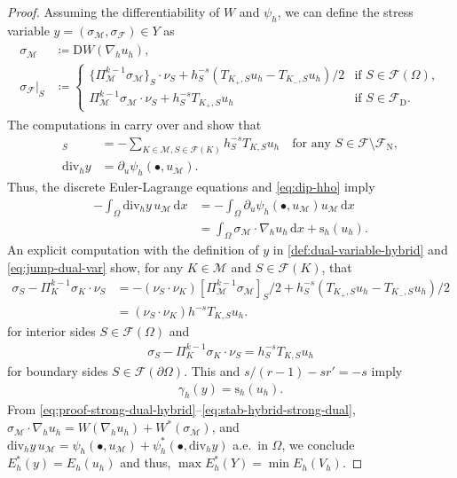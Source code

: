 \documentclass[a4paper]{amsart}
\numberwithin{equation}{section}
\renewcommand{\d}[1]{\,\mathrm{d}#1}
\renewcommand{\div}{\mathrm{div}}
\newcommand{\Mcal}{\mathcal{M}}
\newcommand{\D}{\mathrm{D}}
\newcommand{\s}{\mathrm{s}}
\theoremstyle{remark}
\begin{document}
\begin{proof}
	Assuming the differentiability of $W$ and $\psi_h$, we can define the stress variable $y = (\sigma_\Mcal, \sigma_\mathcal{F}) \in Y$ as
	\begin{align}\label{def:dual-variable-hybrid}
		\begin{split}
			\sigma_\Mcal &\coloneqq \D W(\nabla_h u_h),\\
			\sigma_\mathcal{F}|_S &\coloneqq \begin{cases}
				\{\Pi_\Mcal^{k-1} \sigma_\Mcal\}_S \cdot \nu_S + h_S^{-s}(T_{K_+,S} u_h - T_{K_-,S} u_h)/2 &\mbox{if } S \in \mathcal{F}(\Omega),\\
				\Pi_\Mcal^{k-1} \sigma_\Mcal \cdot \nu_S + h_S^{-s}T_{K_+,S} u_h &\mbox{if } S \in \mathcal{F}_\mathrm{D}.
			\end{cases}
		\end{split} 
	\end{align}
The computations in \cite[Corollary 5.1 and Lemma 5.2]{Tran2024} carry over and show that
	\begin{align}
		[\sigma_\Mcal \nu_S]_S &= - \sum_{K \in \Mcal, S \in \mathcal{F}(K)} h_S^{-s} T_{K,S} u_h \quad\text{for any } S\in\mathcal{F}\setminus\mathcal{F}_\mathrm{N},\label{eq:jump-dual-var}\\
		\div_h y &= \partial_u \psi_h(\bullet,u_\Mcal).\nonumber
	\end{align}
	Thus, the discrete Euler-Lagrange equations and \eqref{eq:dip-hho} imply
	\begin{align}\label{eq:proof-strong-dual-hybrid}
		- \int_\Omega \div_h y\, u_\Mcal \d{x} & = - \int_\Omega \partial_u \psi_h(\bullet,u_\Mcal) u_\Mcal \d{x}\nonumber\\
		& = \int_\Omega \sigma_\Mcal \cdot \nabla_h u_h \d{x} + \s_h(u_h).
	\end{align}
	An explicit computation with the definition of $y$ in \eqref{def:dual-variable-hybrid} and \eqref{eq:jump-dual-var} show, for any $K \in \Mcal$ and $S \in \mathcal{F}(K)$, that
	\begin{align*}
		\sigma_S - \Pi_K^{k-1} \sigma_K \cdot \nu_S &= -(\nu_S \cdot \nu_K)[\Pi_\Mcal^{k-1} \sigma_\Mcal]_S/2 + h_S^{-s}(T_{K_+,S} u_h - T_{K_-,S} u_h)/2\\
        &= (\nu_S \cdot \nu_K)h^{-s} T_{K,S} u_h.
	\end{align*}
	for interior sides $S \in \mathcal{F}(\Omega)$ and
	\begin{align*}
		\sigma_S - \Pi_K^{k-1} \sigma_K \cdot \nu_S = h_S^{-s} T_{K,S} u_h
	\end{align*}
	for boundary sides $S \in \mathcal{F}(\partial \Omega)$.
	This and $s/(r-1) - sr' = -s$ imply
	\begin{align}\label{eq:stab-hybrid-strong-dual}
		\gamma_h(y) = \s_h(u_h).
	\end{align}
	From \eqref{eq:proof-strong-dual-hybrid}--\eqref{eq:stab-hybrid-strong-dual}, $\sigma_\Mcal \cdot \nabla_h u_h = W(\nabla_h u_h) + W^*(\sigma_\Mcal)$, and $\div_h y \,u_\Mcal = \psi_h(\bullet,u_\Mcal) + \psi_h^*(\bullet,\div_h y)$ a.e.~in $\Omega$, we conclude $E_h^*(y) = E_h(u_h)$ and thus, $\max E_h^*(Y) = \min E_h(V_h)$.
\end{proof}
\end{document}
